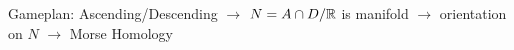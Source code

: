 \documentclass[a4paper,11pt,draft]{article}
\begin{document}
Gameplan: Ascending/Descending $\to$ $N = A \cap D / { \mathbb R }$ is manifold 
$\to$ orientation on $N$ $\to$ Morse Homology








\end{document}
